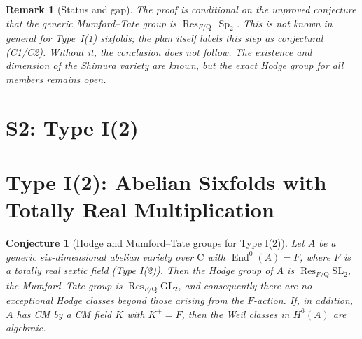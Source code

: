 \documentclass{article}
\DeclareMathOperator{\Res}{Res}
\DeclareMathOperator{\Sp}{Sp}
\newcommand{\Q}{\mathrm{Q}}
\newcommand{\mathbb}[1]{\mathrm{#1}}
\newtheorem{conjecture}{Conjecture}
\newtheorem{remark}{Remark}
\begin{document}
\begin{remark}[Status and gap]
The proof is conditional on the unproved conjecture that the generic
Mumford--Tate group is $\Res_{F/\Q}\,\Sp_2$. This is not known in general for
Type~I(1) sixfolds; the plan itself labels this step as conjectural (C1/C2).
Without it, the conclusion does not follow. The existence and dimension of
the Shimura variety are known, but the exact Hodge group for all members
remains open.
\end{remark}

\section{S2: Type I(2)}
\section{Type I(2): Abelian Sixfolds with Totally Real Multiplication}

\begin{conjecture}[Hodge and Mumford--Tate groups for Type I(2)]
Let $A$ be a generic six-dimensional abelian variety over $\mathbb{C}$ with
$\operatorname{End}^0(A) = F$, where $F$ is a totally real sextic field
(Type I(2)). Then the Hodge group of $A$ is
$\operatorname{Res}_{F/\mathbb{Q}} \mathrm{SL}_2$, the Mumford--Tate group is
$\operatorname{Res}_{F/\mathbb{Q}} \mathrm{GL}_2$, and consequently there are no
exceptional Hodge classes beyond those arising from the $F$-action. If, in
addition, $A$ has CM by a CM field $K$ with $K^+ = F$, then the Weil classes in
$H^6(A)$ are algebraic.
\end{conjecture}
\end{document}
